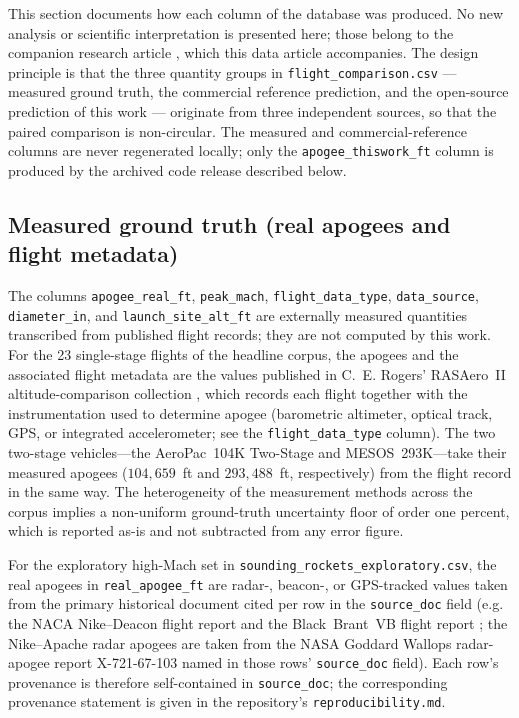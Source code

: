 
This section documents how each column of the database was produced. No new
analysis or scientific interpretation is presented here; those belong to the
companion research article \cite{yu2026jsr}, which this data article accompanies.
The design principle is that the three quantity groups in
\texttt{flight\_comparison.csv} --- measured ground truth, the commercial
reference prediction, and the open-source prediction of this work --- originate
from three independent sources, so that the paired comparison is non-circular.
The measured and commercial-reference columns are never regenerated locally; only
the \texttt{apogee\_thiswork\_ft} column is produced by the archived code release
described below.

\subsection{Measured ground truth (real apogees and flight metadata)}

The columns \texttt{apogee\_real\_ft}, \texttt{peak\_mach},
\texttt{flight\_data\_type}, \texttt{data\_source}, \texttt{diameter\_in}, and
\texttt{launch\_site\_alt\_ft} are externally measured quantities transcribed from
published flight records; they are not computed by this work. For the 23
single-stage flights of the headline corpus, the apogees and the associated flight
metadata are the values published in C.~E. Rogers' RASAero~II altitude-comparison
collection \cite{rogers2015,rogers_rasaero_alt}, which records each flight together
with the instrumentation used to determine apogee (barometric altimeter, optical
track, GPS, or integrated accelerometer; see the \texttt{flight\_data\_type}
column). The two two-stage vehicles---the AeroPac~104K Two-Stage and MESOS~293K---take
their measured apogees ($104{,}659$~ft and $293{,}488$~ft, respectively) from the
flight record in the same way. The heterogeneity of the measurement
methods across the corpus implies a non-uniform ground-truth uncertainty floor of
order one percent, which is reported as-is and not subtracted from any error
figure.

For the exploratory high-Mach set in
\texttt{sounding\_rockets\_exploratory.csv}, the real apogees in
\texttt{real\_apogee\_ft} are radar-, beacon-, or GPS-tracked values taken from the
primary historical document cited per row in the \texttt{source\_doc} field (e.g.
the NACA Nike--Deacon flight report \cite{heitkotter1956} and the Black~Brant~VB
flight report \cite{dtic_ad0733141}; the Nike--Apache radar apogees are taken from
the NASA Goddard Wallops radar-apogee report X-721-67-103 named in those rows'
\texttt{source\_doc} field). Each row's provenance is therefore self-contained
in \texttt{source\_doc}; the corresponding provenance statement is given in the
repository's \texttt{reproducibility.md}.

